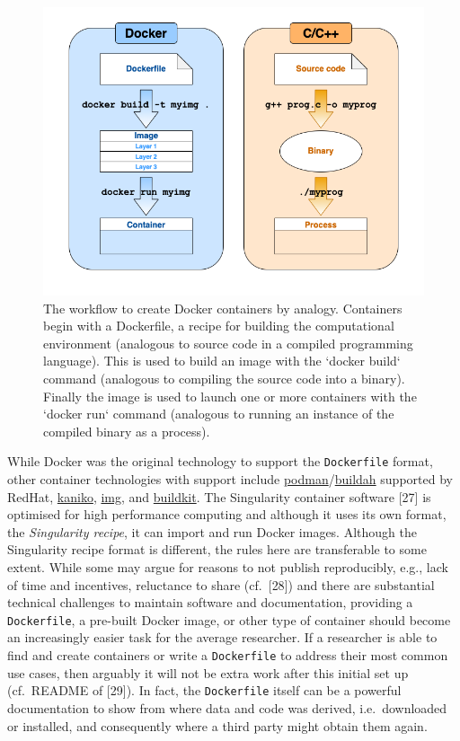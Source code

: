 \documentclass[10pt,letterpaper]{article}
\begin{document}
\begin{figure}
\includegraphics[width=1\linewidth]{container-analogy} \caption{The workflow to create Docker containers by analogy. Containers begin with a Dockerfile, a recipe for building the computational environment (analogous to source code in a compiled programming language). This is used to build an image with the `docker build` command (analogous to compiling the source code into a binary). Finally the image is used to launch one or more containers with the `docker run` command (analogous to running an instance of the compiled binary as a process).}\label{fig:container-analogy}
\end{figure}

While Docker was the original technology to support the
\texttt{Dockerfile} format, other container technologies with support
include
\href{https://podman.io/}{podman}/\href{https://github.com/containers/buildah}{buildah}
supported by RedHat,
\href{https://github.com/GoogleContainerTools/kaniko}{kaniko},
\href{https://github.com/genuinetools/img}{img}, and
\href{https://github.com/moby/buildkit}{buildkit}. The Singularity
container software {[}27{]} is optimised for high performance computing
and although it uses its own format, the \emph{Singularity recipe}, it
can import and run Docker images. Although the Singularity recipe format
is different, the rules here are transferable to some extent. While some
may argue for reasons to not publish reproducibly, e.g., lack of time
and incentives, reluctance to share (cf.~{[}28{]}) and there are
substantial technical challenges to maintain software and documentation,
providing a \texttt{Dockerfile}, a pre-built Docker image, or other type
of container should become an increasingly easier task for the average
researcher. If a researcher is able to find and create containers or
write a \texttt{Dockerfile} to address their most common use cases, then
arguably it will not be extra work after this initial set up (cf.~README
of {[}29{]}). In fact, the \texttt{Dockerfile} itself can be a powerful
documentation to show from where data and code was derived,
i.e.~downloaded or installed, and consequently where a third party might
obtain them again.
\end{document}
